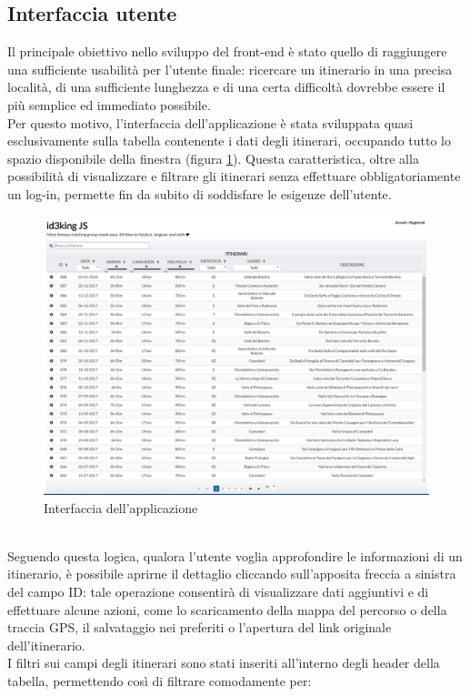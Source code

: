 \documentclass[11pt]{report}
\begin{document}
\subsection{Interfaccia utente}
Il principale obiettivo nello sviluppo del front-end è stato quello di raggiungere una sufficiente usabilità per l'utente finale: ricercare un itinerario in una precisa località, di una sufficiente lunghezza e di una certa difficoltà dovrebbe essere il più semplice ed immediato possibile.
\\Per questo motivo, l'interfaccia dell'applicazione è stata sviluppata quasi esclusivamente sulla tabella contenente i dati degli itinerari, occupando tutto lo spazio disponibile della finestra (figura \ref{ui_1}).
Questa caratteristica, oltre alla possibilità di visualizzare e filtrare gli itinerari senza effettuare obbligatoriamente un log-in, permette fin da subito di soddisfare le esigenze dell'utente.
\begin{figure}[h]
	\centering
	\includegraphics[scale=0.35]{ui_1.png}
	\caption{Interfaccia dell'applicazione \label{ui_1}}
\end{figure}
\\Seguendo questa logica, qualora l'utente voglia approfondire le informazioni di un itinerario, è possibile aprirne il dettaglio cliccando sull'apposita freccia a sinistra del campo ID: tale operazione consentirà di visualizzare dati aggiuntivi e di effettuare alcune azioni, come lo scaricamento della mappa del percorso o della traccia GPS, il salvataggio nei preferiti o l'apertura del link originale dell'itinerario.
\\I filtri sui campi degli itinerari sono stati inseriti all'interno degli header della tabella, permettendo così di filtrare comodamente per:
\end{document}
